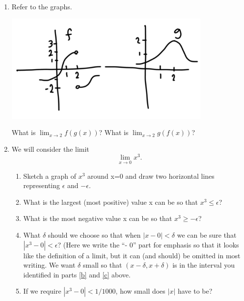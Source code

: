 \documentclass[11pt]{book}
\begin{document}
\begin{enumerate}

\item
Refer to the graphs.

\begin{center}
\includegraphics[width=4in]{limitExerciseImage1.png}
\end{center}

What is $\lim_{x\to 2} f(g(x))$?  What is $\lim_{x\to 2} g(f(x))$?




\item 

We will consider the limit $$\lim_{x\to 0} x^3.$$ 

\begin{enumerate}
\item 
Sketch a graph of $x^3$ around x=0 and draw two horizontal lines representing $\epsilon$ and $-\epsilon$. 



\item \label{b}
 What is the largest (most positive) value x can be so that   $x^3\leq \epsilon$?  
 

 
 \item \label{c}
  What is the most negative value x can be so that $x^3\geq -\epsilon$?



\item
What $\delta$ should we choose so that when $|x-0|<\delta$ we can be sure that $|x^3-0|<\epsilon$?  (Here we write the ``- 0'' part for emphasis so that it looks like the definition of a limit, but it can (and should) be omitted in most writing.  We want $\delta$ small so that $(x-\delta,x+\delta)$ is in the interval you identified in parts \ref{b} and \ref{c} above.



\item
If we require $|x^3-0|<1/1000$, how small does $|x|$ have to be?  




\end{enumerate}
\end{enumerate}
\end{document}
